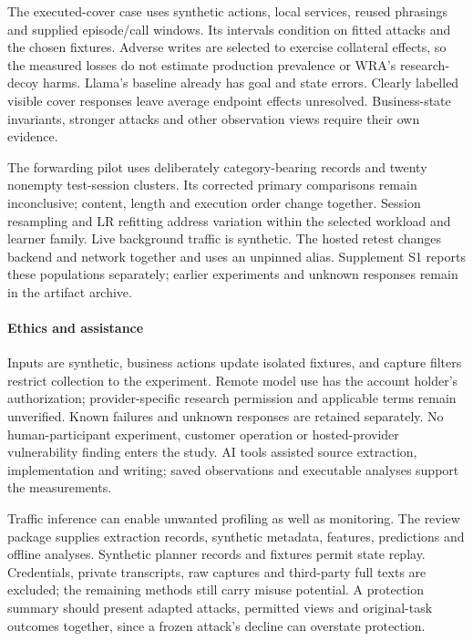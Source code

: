 The executed-cover case uses synthetic actions, local services, reused phrasings and supplied episode/call windows. Its intervals condition on fitted attacks and the chosen fixtures. Adverse writes are selected to exercise collateral effects, so the measured losses do not estimate production prevalence or WRA's research-decoy harms. Llama's baseline already has goal and state errors. Clearly labelled visible cover responses leave average endpoint effects unresolved. Business-state invariants, stronger attacks and other observation views require their own evidence.

The forwarding pilot uses deliberately category-bearing records and twenty nonempty test-session clusters. Its corrected primary comparisons remain inconclusive; content, length and execution order change together. Session resampling and LR refitting address variation within the selected workload and learner family. Live background traffic is synthetic. The hosted retest changes backend and network together and uses an unpinned alias. Supplement S1 reports these populations separately; earlier experiments and unknown responses remain in the artifact archive.

\paragraph{Ethics and assistance}
Inputs are synthetic, business actions update isolated fixtures, and capture filters restrict collection to the experiment. Remote model use has the account holder's authorization; provider-specific research permission and applicable terms remain unverified. Known failures and unknown responses are retained separately. No human-participant experiment, customer operation or hosted-provider vulnerability finding enters the study. AI tools assisted source extraction, implementation and writing; saved observations and executable analyses support the measurements.

Traffic inference can enable unwanted profiling as well as monitoring. The review package supplies extraction records, synthetic metadata, features, predictions and offline analyses. Synthetic planner records and fixtures permit state replay. Credentials, private transcripts, raw captures and third-party full texts are excluded; the remaining methods still carry misuse potential. A protection summary should present adapted attacks, permitted views and original-task outcomes together, since a frozen attack's decline can overstate protection.

